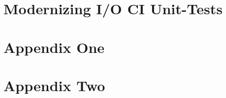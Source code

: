 \documentclass[12pt]{niuthesis}
\begin{document}
\chapter{Modernizing I/O CI Unit-Tests}


\printbibliography

\clearpage
\appendix
\chapter{Appendix One}


\chapter{Appendix Two}

\end{document}
